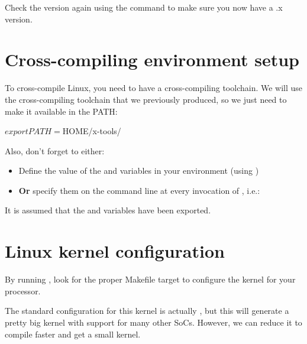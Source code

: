 Check the version again using the  command
to make sure you now have a \workingkernel.x version.

\section{Cross-compiling environment setup}

To cross-compile Linux, you need to have a cross-compiling
toolchain. We will use the cross-compiling toolchain that we
previously produced, so we just need to make it available in the PATH:

\begin{bashinput}
$ export PATH=$HOME/x-tools/%
\end{bashinput}

Also, don't forget to either:

\begin{itemize}
\item Define the value of the  and 
  variables in your environment (using )
\item {\bf Or} specify them on the command line at every invocation of
  , i.e.: 
\end{itemize}

It is assumed that the  and  variables have been exported.

\section{Linux kernel configuration}

By running , look for the proper Makefile target to
configure the kernel for your processor.

{The standard configuration for this kernel is actually ,
but this will generate a pretty big kernel with support for many other
SoCs. However, we can reduce it to compile faster and get a small
kernel.}{}

